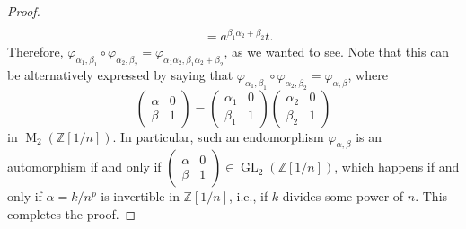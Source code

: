 \documentclass[english]{amsart}
\theoremstyle{definition}
\newcommand\ZZ{\mathbb{Z}}
\newcommand{\Mat}{\operatorname{M}}
\newcommand{\GL}{\operatorname{GL}}
\begin{document}
\begin{proof}
\begin{align*}
\\ &= a^{\beta_1\alpha_2+\beta_2} t.
 \end{align*}
Therefore, $\varphi_{\alpha_1,\beta_1} \circ \varphi_{\alpha_2,\beta_2} =\varphi_{\alpha_1\alpha_2, \beta_1\alpha_2+\beta_2}$, as we wanted to see. Note that this can be alternatively expressed by saying that $\varphi_{\alpha_1, \beta_1}\circ \varphi_{\alpha_2, \beta_2} =\varphi_{\alpha, \beta}$, where 
 $$
\left( \begin{array}{cc} \alpha & 0 \\ \beta & 1 \end{array}\right) = \left( \begin{array}{cc} \alpha_1 & 0 \\ \beta_1 & 1 \end{array}\right)\left( \begin{array}{cc} \alpha_2 & 0 \\ \beta_2 & 1 \end{array}\right)
 $$
in $\Mat_2(\ZZ[1/n])$. In particular, such an endomorphism $\varphi_{\alpha, \beta}$ is an automorphism if and only if $\left( \begin{smallmatrix} \alpha & 0 \\ \beta & 1 \end{smallmatrix} \right)\in \GL_2(\ZZ[1/n])$, which happens if and only if $\alpha=k/n^p$ is invertible in $\ZZ[1/n]$, i.e., if $k$ divides some power of $n$. This completes the proof. 
\end{proof}
\end{document}
